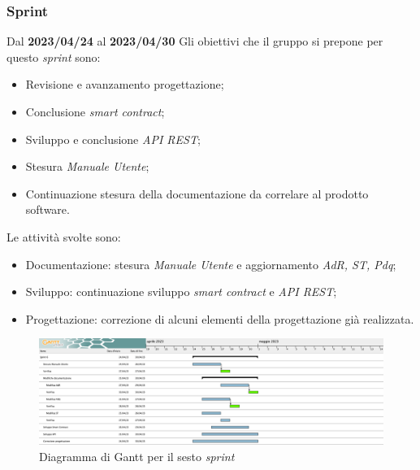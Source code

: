 \subsubsection{ Sprint}
Dal \textbf{2023/04/24} al \textbf{2023/04/30}
\newline
Gli obiettivi che il gruppo si prepone per questo \textit{sprint} sono:
\begin{itemize}
    \item Revisione e avanzamento progettazione;
    \item Conclusione \textit{smart contract};
    \item Sviluppo e conclusione \textit{API REST};
    \item Stesura \textit{Manuale Utente};
    \item Continuazione stesura della documentazione da correlare al prodotto software.
\end{itemize}
Le attività svolte sono:
\begin{itemize}
    \item Documentazione: stesura \textit{Manuale Utente} e aggiornamento \textit{AdR, ST, Pdq};
    \item Sviluppo: continuazione sviluppo \textit{smart contract} e \textit{API REST};
    \item Progettazione: correzione di alcuni elementi della progettazione già realizzata.
\end{itemize}
\begin{figure}[H]
    \centering
    \includegraphics[width=\textwidth]{src/img/Sprint 6.png}
    \caption{Diagramma di Gantt per il sesto \textit{sprint}}
\end{figure}
